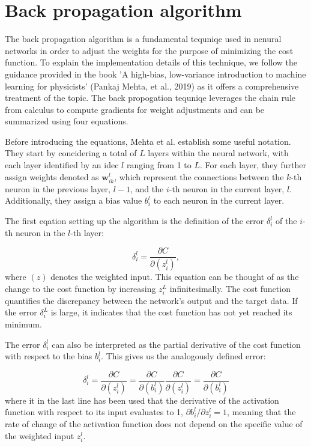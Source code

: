 \documentclass[a4paper, UKenglish, 11pt]{uiomaster}
\begin{document}
\section{Back propagation algorithm}
The back propagation algorithm is a fundamental tequniqe used in nenural networks in order to adjust the weights for the purpose of minimizing the cost function. To explain the implementation details of this technique, we follow the guidance provided in the book 'A high-bias, low-variance introduction to machine learning for physicists' (Pankaj Mehta, et al., 2019) as it offers a comprehensive treatment of the topic. The back propogation tequniqe leverages the chain rule from calculus to compute gradients for weight adjustments and can be summarized using four equations.

Before introducing the equations, Mehta et al. establish some useful notation. They start by concidering a total of $L$ layers within the neural network, with each layer identified by an idec $l$ ranging from 1 to $L$. For each layer, they further assign weights denoted as $\mathbf{w}^l_{ik}$, which represent the connections between the $k$-th neuron in the previous layer, $l-1$, and the $i$-th neuron in the current layer, $l$. Additionally, they assign a bias value $b^l_i$ to each neuron in the current layer.

The first eqation setting up the algorithm is the definition of the error $\delta_i^l$ of the $i$-th neuron in the $l$-th layer:

\begin{equation}
    \delta_i^l = \frac{\partial C}{\partial(z_i^l)},
\label{eq:I}
\end{equation}
where $(z)$ denotes the weighted input. This equation can be thought of as the change to the cost function by increasing $z_i^L$ infinitesimally. The cost function quantifies the discrepancy between the network's output and the target data. If the error $\delta_i^L$ is large, it indicates that the cost function has not yet reached its minimum.

The error $\delta^l_i$ can also be interpreted as the partial derivative of the cost function with respect to the bias $b^l_i$. This gives us the analogously defined error:

\begin{equation}
    \delta_i^l = \frac{\partial C}{\partial(z_i^l)} = \frac{\partial C}{\partial(b_i^l)}\frac{\partial C}{\partial(z_i^l)} = \frac{\partial C}{\partial(b_i^l)}
\label{eq:II}
\end{equation}
where it in the last line has been used that the derivative of the activation function with respect to its input evaluates to 1, $\partial b^l_i / \partial z_i^l = 1$, meaning that the rate of change of the activation function does not depend on the specific value of the weighted input $z_i^l$.
\end{document}
